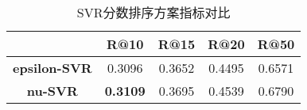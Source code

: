 \documentclass[11pt]{article}
\begin{document}
\begin{CJK}{UTF8}{gkai}
\begin{table}[htbp]
  \centering
  \begin{tabular}{c|c|c|c|c}
    \hline
    & \textbf{R@10} & \textbf{R@15} & \textbf{R@20} & \textbf{R@50} \\
    \hline
    \textbf{epsilon-SVR} & 0.3096  & 0.3652  & 0.4495  & 0.6571  \\
    \hline
    \textbf{ nu-SVR} & \textcolor[rgb]{ 1,  0,  0}{\textbf{0.3109 }} & 0.3695  & 0.4539  & 0.6790  \\
    \hline
  \end{tabular}%
  \caption{SVR分数排序方案指标对比}
  \label{tab:addlabel}%
\end{table}%


\end{CJK}
\end{document}
